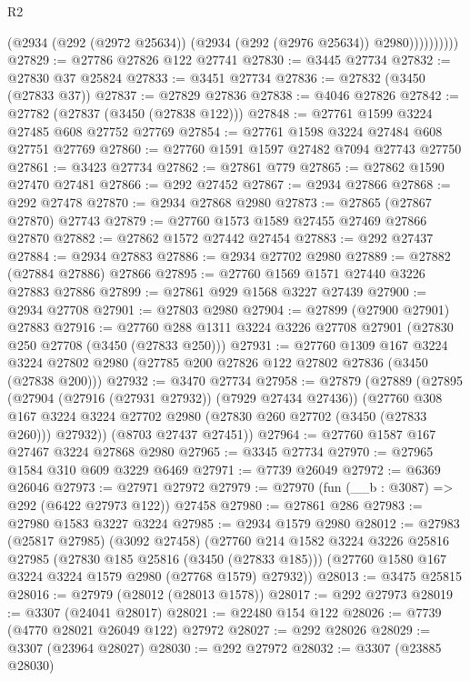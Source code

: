 \begin{lexlean}{R2}
\begin{coremodule}
                    (@2934 (@292 (@2972 @25634)) (@2934 (@292 (@2976 @25634)) @2980))))))))))
@27829 := @27786 @27826 @122 @27741
@27830 := @3445 @27734
@27832 := @27830 @37 @25824
@27833 := @3451 @27734
@27836 := @27832 (@3450 (@27833 @37))
@27837 := @27829 @27836
@27838 := @4046 @27826
@27842 := @27782 (@27837 (@3450 (@27838 @122)))
@27848 := @27761 @1599 @3224 @27485 @608 @27752 @27769
@27854 := @27761 @1598 @3224 @27484 @608 @27751 @27769
@27860 := @27760 @1591 @1597 @27482 @7094 @27743 @27750
@27861 := @3423 @27734
@27862 := @27861 @779
@27865 := @27862 @1590 @27470 @27481
@27866 := @292 @27452
@27867 := @2934 @27866
@27868 := @292 @27478
@27870 := @2934 @27868 @2980
@27873 := @27865 (@27867 @27870) @27743
@27879 := @27760 @1573 @1589 @27455 @27469 @27866 @27870
@27882 := @27862 @1572 @27442 @27454
@27883 := @292 @27437
@27884 := @2934 @27883
@27886 := @2934 @27702 @2980
@27889 := @27882 (@27884 @27886) @27866
@27895 := @27760 @1569 @1571 @27440 @3226 @27883 @27886
@27899 := @27861 @929 @1568 @3227 @27439
@27900 := @2934 @27708
@27901 := @27803 @2980
@27904 := @27899 (@27900 @27901) @27883
@27916 := @27760 @288 @1311 @3224 @3226 @27708 @27901 (@27830 @250 @27708 (@3450 (@27833 @250)))
@27931 := @27760
    @1309
    @167
    @3224
    @3224
    @27802
    @2980
    (@27785 @200 @27826 @122 @27802 @27836 (@3450 (@27838 @200)))
@27932 := @3470 @27734
@27958 := @27879
    (@27889
      (@27895
        (@27904 (@27916 (@27931 @27932)) (@7929 @27434 @27436))
        (@27760
          @308
          @167
          @3224
          @3224
          @27702
          @2980
          (@27830 @260 @27702 (@3450 (@27833 @260)))
          @27932))
      (@8703 @27437 @27451))
@27964 := @27760 @1587 @167 @27467 @3224 @27868 @2980
@27965 := @3345 @27734
@27970 := @27965 @1584 @310 @609 @3229 @6469
@27971 := @7739 @26049
@27972 := @6369 @26046
@27973 := @27971 @27972
@27979 := @27970 (fun (__b : @3087) => @292 (@6422 @27973 @122)) @27458
@27980 := @27861 @286
@27983 := @27980 @1583 @3227 @3224
@27985 := @2934 @1579 @2980
@28012 := @27983
    (@25817 @27985)
    (@3092 @27458)
    (@27760
      @214
      @1582
      @3224
      @3226
      @25816
      @27985
      (@27830 @185 @25816 (@3450 (@27833 @185)))
      (@27760 @1580 @167 @3224 @3224 @1579 @2980 (@27768 @1579) @27932))
@28013 := @3475 @25815
@28016 := @27979 (@28012 (@28013 @1578))
@28017 := @292 @27973
@28019 := @3307 (@24041 @28017)
@28021 := @22480 @154 @122
@28026 := @7739 (@4770 @28021 @26049 @122) @27972
@28027 := @292 @28026
@28029 := @3307 (@23964 @28027)
@28030 := @292 @27972
@28032 := @3307 (@23885 @28030)

\end{coremodule}
\end{lexlean}
